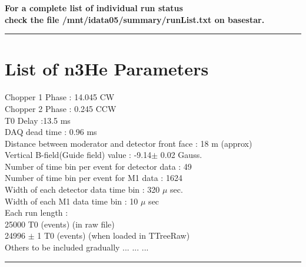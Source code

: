 \documentclass[12pt]{article}
\begin{document}
\textbf{ For a complete list of individual run status \\
check the file /mnt/idata05/summary/runList.txt on basestar.}

\noindent
{\color{red} \rule{\linewidth}{1mm} }

\newpage
\section{List of n3He Parameters}
Chopper 1 Phase : 14.045 CW \\
Chopper 2 Phase : 0.245 CCW \\
T0 Delay :13.5 ms \\
DAQ dead time : 0.96 ms \\
Distance between moderator and detector front face : 18 m (approx) \\
Vertical B-field(Guide field) value : -9.14$\pm$ 0.02 Gauss.\\
Number of time bin per event for detector data : 49\\
Number of time bin per event for M1 data : 1624\\
Width of each detector data time bin : 320 $\mu$ sec.\\
Width of each M1 data time bin : 10 $\mu$ sec\\
Each run length : \\
\hspace{5cm} 25000 T0 (events) (in raw file)\\
\hspace{5cm} 24996 $\pm$ 1 T0 (events) (when loaded in TTreeRaw)\\


Others to be included gradually ... ... ... \\



\noindent
{\color{red} \rule{\linewidth}{1mm} }
\end{document}
